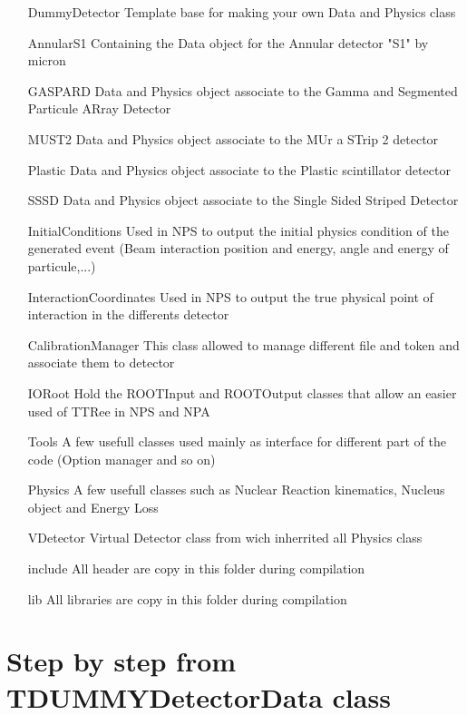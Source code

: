 \documentclass{book}
\begin{document}
		
		\begin{itemize}
			\item[DummyDetector] Template base for making your own Data and Physics class
			\item[AnnularS1] Containing the Data object for the Annular detector "S1" by micron 
			\item[GASPARD] Data and Physics object associate to the Gamma and Segmented Particule ARray Detector
			\item[MUST2] Data and Physics object associate to the MUr a STrip 2 detector
			\item[Plastic] Data and Physics object associate to the Plastic scintillator detector
			\item[SSSD] Data and Physics object associate to the Single Sided Striped Detector
			\item[InitialConditions] Used in NPS to output the initial physics condition of the generated event (Beam interaction position and energy, angle and energy of particule,...)
			\item[InteractionCoordinates] Used in NPS to output the true physical point of interaction in the differents detector
			\item[CalibrationManager] This class allowed to manage different file and token and associate them to detector
			\item[IORoot] Hold the ROOTInput and ROOTOutput classes that allow an easier used of TTRee in NPS and NPA
			\item[Tools] A few usefull classes used mainly as interface for different part of the code (Option manager and so on)
			\item[Physics] A few usefull classes such as Nuclear Reaction kinematics, Nucleus object and Energy Loss
			\item[VDetector] Virtual Detector class from wich inherrited all Physics class
			\item[include] All header are copy in this folder during compilation
			\item[lib] All libraries are copy in this folder during compilation
		\end{itemize}
		
	\section{Step by step from TDUMMYDetectorData class}
\end{document}
